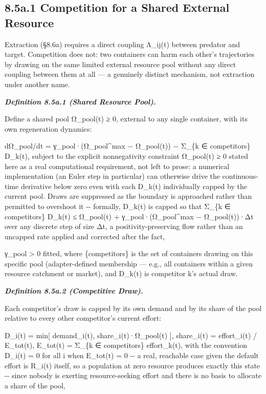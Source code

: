 \documentclass[
]{article}
\begin{document}
\hypertarget{a.1-competition-for-a-shared-external-resource}{%
\subsection{8.5a.1 Competition for a Shared External
Resource}\label{a.1-competition-for-a-shared-external-resource}}

Extraction (§8.6a) requires a direct coupling Λ\_ij(t) between predator
and target. Competition does not: two containers can harm each other's
trajectories by drawing on the same limited external resource pool
without any direct coupling between them at all --- a genuinely distinct
mechanism, not extraction under another name.

\emph{\textbf{Definition 8.5a.1 (Shared Resource Pool).}}

Define a shared pool Ω\_pool(t) ≥ 0, external to any single container,
with its own regeneration dynamics:

dΩ\_pool/dt = γ\_pool·(Ω\_pool\^{}max − Ω\_pool(t)) − Σ\_\{k ∈
competitors\} D\_k(t), subject to the explicit nonnegativity constraint
Ω\_pool(t) ≥ 0 stated here as a real computational requirement, not left
to prose: a numerical implementation (an Euler step in particular) can
otherwise drive the continuous-time derivative below zero even with each
D\_k(t) individually capped by the current pool. Draws are suppressed as
the boundary is approached rather than permitted to overshoot it -\/-
formally, D\_k(t) is capped so that Σ\_\{k ∈ competitors\} D\_k(t) ≤
Ω\_pool(t) + γ\_pool·(Ω\_pool\^{}max − Ω\_pool(t))·Δt over any discrete
step of size Δt, a positivity-preserving flow rather than an uncapped
rate applied and corrected after the fact,

γ\_pool \textgreater{} 0 fitted, where \{competitors\} is the set of
containers drawing on this specific pool (adapter-defined membership ---
e.g., all containers within a given resource catchment or market), and
D\_k(t) is competitor k's actual draw.

\emph{\textbf{Definition 8.5a.2 (Competitive Draw).}}

Each competitor's draw is capped by its own demand and by its share of
the pool relative to every other competitor's current effort:

D\_i(t) = min{[} demand\_i(t), share\_i(t)·Ω\_pool(t) {]}, share\_i(t) =
effort\_i(t) / E\_tot(t), E\_tot(t) = Σ\_\{k ∈ competitors\}
effort\_k(t), with the convention D\_i(t) = 0 for all i when E\_tot(t) =
0 -\/- a real, reachable case given the default effort is R\_i(t)
itself, so a population at zero resource produces exactly this state
-\/- since nobody is exerting resource-seeking effort and there is no
basis to allocate a share of the pool,
\end{document}
